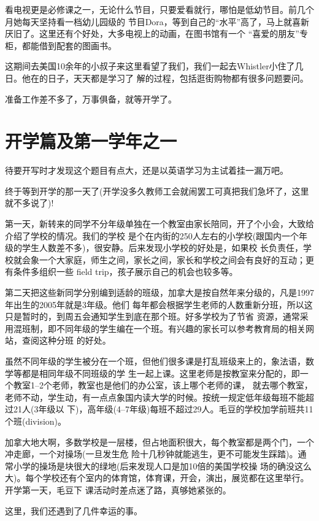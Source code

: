 \documentclass[11pt,a4paper,onecolumn]{article}
\begin{document}
看电视更是必修课之一，无论什么节目，只要爱看就行，哪怕是低幼节目。前几个月她每天坚持看一档幼儿园级的
节目Dora，等到自己的``水平''高了，马上就喜新厌旧了。这里还有个好处，大多电视上的动画，在图书馆有一个
``喜爱的朋友''专柜，都能借到配套的图画书。

这期间去美国10余年的小叔子来这里看望了我们，我们一起去Whistler小住了几日。他在的日子，天天都是学习了
解的过程，包括逛街购物都有很多问题要问。

准备工作差不多了，万事俱备，就等开学了。

\section{开学篇及第一学年之一}

待要开写时才发现这个题目有点大，还是以英语学习为主试着挂一漏万吧。

终于等到开学的那一天了(开学没多久教师工会就闹罢工可真把我们急坏了，这里就不多说了)!

第一天，新转来的同学不分年级单独在一个教室由家长陪同，开了个小会，大致给介绍了学校的情况。我们的学校
是个在内街的250人左右的小学校(跟国内一个年级的学生人数差不多)，很安静。后来发现小学校的好处是，如果校
长负责任，学校就会象一个大家庭，师生之间，家长之间，家长和学校之间会有良好的互动；更有条件多组织一些
field trip，孩子展示自己的机会也较多等。

第二天把这些新同学分别编到适龄的班级，加拿大是按自然年来分级的，凡是1997年出生的2005年就是3年级。他们
每年都会根据学生老师的人数重新分班，所以这只是暂时的，到周五会通知学生到底在那个班。好多学校为了节省
资源，通常采用混班制，即不同年级的学生编在一个班。有兴趣的家长可以参考教育局的相关网站，查阅这种分班
的好处。

虽然不同年级的学生被分在一个班，但他们很多课是打乱班级来上的，象法语，数学等都是相同年级不同班级的学
生一起上课。这里老师是按教室来分配的，即一个教室1--2个老师，教室也是他们的办公室，该上哪个老师的课，
就去哪个教室，老师不动，学生动，有一点点象国内读大学的时候。按统一规定低年级每班不能超过21人(3年级以
下)，高年级(4--7年级)每班不超过29人。毛豆的学校加学前班共11个班(division)。

加拿大地大啊，多数学校是一层楼，但占地面积很大，每个教室都是两个门，一个冲走廊，一个对操场(一旦发生危
险十几秒钟就能逃生，更不可能发生踩踏)。通常小学的操场是块很大的绿地(后来发现人口是加10倍的美国学校操
场的确没这么大)。每个学校还有个室内的体育馆，体育课，开会，演出，展览都在这里举行。开学第一天，毛豆下
课活动时差点迷了路，真够她紧张的。

这里，我们还遇到了几件幸运的事。
\end{document}
